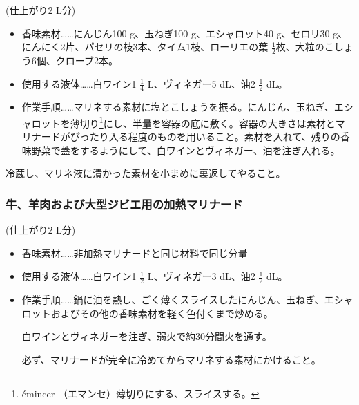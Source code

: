\begin{recette}
(仕上がり2 L分)

\begin{itemize}
\item
  香味素材\ldots{}\ldots{}にんじん100 g、玉ねぎ100 g、エシャロット40
  g、セロリ30 g、にんにく2片、パセリの枝3本、タイム1枝、ローリエの葉
  \(\frac{1}{2}\)枚、大粒のこしょう6個、クローブ2本。
\item
  使用する液体\ldots{}\ldots{}白ワイン1 \(\frac{1}{4}\) L、ヴィネガー5
  dL、油2 \(\frac{1}{2}\) dL。
\item
  作業手順\ldots{}\ldots{}マリネする素材に塩とこしょうを振る。にんじん、玉ねぎ、エシャロットを薄切り\footnote{émincer
    （エマンセ）薄切りにする、スライスする。}にし、半量を容器の底に敷く。容器の大きさは素材とマリナードがぴったり入る程度のものを用いること。素材を入れて、残りの香味野菜で蓋をするようにして、白ワインとヴィネガー、油を注ぎ入れる。
\end{itemize}

冷蔵し、マリネ液に漬かった素材を小まめに裏返してやること。

\hypertarget{marinade-cuite-pour-viandes-de-boucherie-ou-venaison}{%
\subsubsection{牛、羊肉および大型ジビエ用の加熱マリナード}\label{marinade-cuite-pour-viandes-de-boucherie-ou-venaison}}



(仕上がり2 L分)

\begin{itemize}
\item
  香味素材\ldots{}\ldots{}非加熱マリナードと同じ材料で同じ分量
\item
  使用する液体\ldots{}\ldots{}白ワイン1 \(\frac{1}{2}\) L、ヴィネガー3
  dL、油2 \(\frac{1}{2}\) dL。
\item
  作業手順\ldots{}\ldots{}鍋に油を熱し、ごく薄くスライスしたにんじん、玉ねぎ、エシャロットおよびその他の香味素材を軽く色付くまで炒める。

  白ワインとヴィネガーを注ぎ、弱火で約30分間火を通す。

  必ず、マリナードが完全に冷めてからマリネする素材にかけること。
\end{itemize}


\end{recette}
